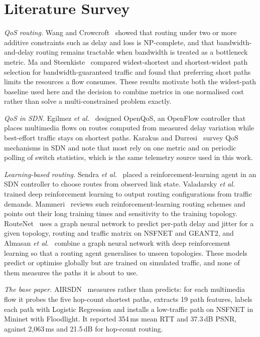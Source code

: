 \documentclass[conference,a4paper]{IEEEtran}
\begin{document}
\section{Literature Survey}
\textit{QoS routing.} Wang and Crowcroft~\cite{wang1996qos} showed that routing under two or more additive
constraints such as delay and loss is NP-complete, and that bandwidth-and-delay routing remains tractable when
bandwidth is treated as a bottleneck metric. Ma and Steenkiste~\cite{ma1997widest} compared widest-shortest and
shortest-widest path selection for bandwidth-guaranteed traffic and found that preferring short paths limits the
resources a flow consumes. These results motivate both the widest-path baseline used here and the decision to
combine metrics in one normalised cost rather than solve a multi-constrained problem exactly.

\textit{QoS in SDN.} Egilmez \textit{et al.}~\cite{egilmez2012openqos} designed OpenQoS, an OpenFlow controller
that places multimedia flows on routes computed from measured delay variation while best-effort traffic stays on
shortest paths. Karakus and Durresi~\cite{karakus2017qos} survey QoS mechanisms in SDN and note that most rely on
one metric and on periodic polling of switch statistics, which is the same telemetry source used in this work.

\textit{Learning-based routing.} Sendra \textit{et al.}~\cite{sendra2017ai} placed a reinforcement-learning agent
in an SDN controller to choose routes from observed link state. Valadarsky \textit{et al.}~\cite{
valadarsky2017learning} trained deep reinforcement learning to output routing configurations from traffic demands.
Mammeri~\cite{mammeri2019rl} reviews such reinforcement-learning routing schemes and points out their long training
times and sensitivity to the training topology. RouteNet~\cite{rusek2020routenet} uses a graph neural network to
predict per-path delay and jitter for a given topology, routing and traffic matrix on NSFNET and GEANT2, and
Almasan \textit{et al.}~\cite{almasan2022drlgnn} combine a graph neural network with deep reinforcement learning so
that a routing agent generalises to unseen topologies. These models predict or optimise globally but are trained on
simulated traffic, and none of them measures the paths it is about to use.

\textit{The base paper.} AIRSDN~\cite{ipek2025airsdn} measures rather than predicts: for each multimedia flow it
probes the five hop-count shortest paths, extracts 19 path features, labels each path with Logistic Regression and
installs a low-traffic path on NSFNET in Mininet with Floodlight. It reported 354\,ms mean RTT and 37.3\,dB PSNR,
against 2,063\,ms and 21.5\,dB for hop-count routing.
\end{document}
